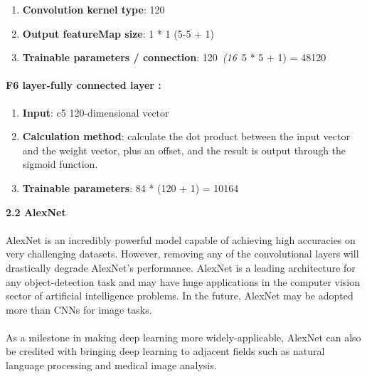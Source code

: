 \documentclass[10pt]{article} %
\begin{document}
\begin{spacing}{1.5}
\begin{enumerate}
\item  \textbf{Convolution kernel type}: 120

\item  \textbf{Output featureMap size}: 1 * 1 (5-5 + 1)

\item  \textbf{Trainable parameters / connection}: 120~\textit{(16~}5 * 5 + 1) = 48120
\end{enumerate}

\noindent 
\paragraph{F6 layer-fully connected layer :}

\begin{enumerate}
\item \textbf{ Input}: c5 120-dimensional vector

\item  \textbf{Calculation method}: calculate the dot product between the input vector and the weight vector, plus an offset, and the result is output through the sigmoid function.

\item  \textbf{Trainable parameters}: 84 * (120 + 1) = 10164
\end{enumerate}

\noindent 

\noindent 

\noindent 

\noindent 

\noindent 

\noindent 

\noindent 
\newpage
\noindent \textbf{2.2 AlexNet}
\vspace{2mm}
\paragraph{}
\justifying
\noindent AlexNet is an incredibly powerful model capable of achieving high accuracies on very challenging datasets. However, removing any of the convolutional layers will drastically degrade AlexNet's performance. AlexNet is a leading architecture for any object-detection task and may have huge applications in the computer vision sector of artificial intelligence problems. In the future, AlexNet may be adopted more than CNNs for image tasks.
\paragraph{}
\noindent As a milestone in making deep learning more widely-applicable, AlexNet can also be credited with bringing deep learning to adjacent fields such as natural language processing and medical image analysis.\textbf{}
\vspace{2mm}

\end{spacing}
\end{document}

